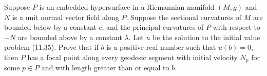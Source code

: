 \begin{exercise}\label{prob:focal-points-hypersurface-ii}
Suppose $P$ is an embedded hypersurface in a Riemannian manifold $(M, g)$ and $N$ is a unit normal vector field along $P$. Suppose the sectional curvatures of $M$ are bounded below by a constant $c$, and the principal curvatures of $P$ with respect to $-N$ are bounded above by a constant $\lambda$. Let $u$ be the solution to the initial value problem (11.35). Prove that if $b$ is a positive real number such that $u(b) = 0$, then $P$ has a focal point along every geodesic segment with initial velocity $N_p$ for some $p \in P$ and with length greater than or equal to $b$.
\end{exercise}
